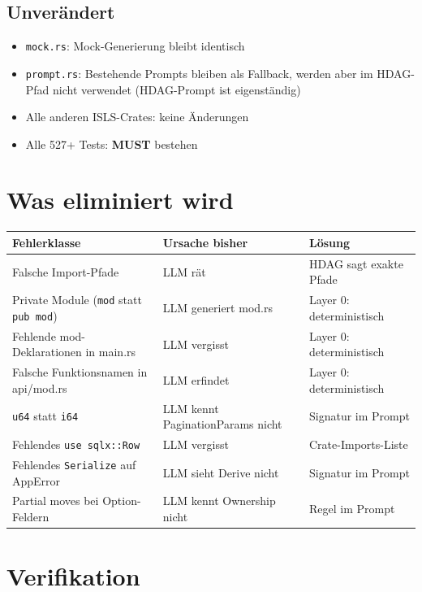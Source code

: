 \documentclass[11pt,a4paper]{article}
\newcommand{\must}{\textbf{MUST}}
\begin{document}
\subsection{Unverändert}

\begin{itemize}[nosep]
\item \texttt{mock.rs}: Mock-Generierung bleibt identisch
\item \texttt{prompt.rs}: Bestehende Prompts bleiben als Fallback,
  werden aber im HDAG-Pfad nicht verwendet (HDAG-Prompt ist eigenständig)
\item Alle anderen ISLS-Crates: keine Änderungen
\item Alle 527+ Tests: \must{} bestehen
\end{itemize}

\section{Was eliminiert wird}

\begin{center}
\begin{tabular}{lll}
\toprule
\textbf{Fehlerklasse} & \textbf{Ursache bisher} & \textbf{Lösung} \\
\midrule
Falsche Import-Pfade & LLM rät & HDAG sagt exakte Pfade \\
Private Module (\texttt{mod} statt \texttt{pub mod}) & LLM generiert mod.rs & Layer 0: deterministisch \\
Fehlende mod-Deklarationen in main.rs & LLM vergisst & Layer 0: deterministisch \\
Falsche Funktionsnamen in api/mod.rs & LLM erfindet & Layer 0: deterministisch \\
\texttt{u64} statt \texttt{i64} & LLM kennt PaginationParams nicht & Signatur im Prompt \\
Fehlendes \texttt{use sqlx::Row} & LLM vergisst & Crate-Imports-Liste \\
Fehlendes \texttt{Serialize} auf AppError & LLM sieht Derive nicht & Signatur im Prompt \\
Partial moves bei Option-Feldern & LLM kennt Ownership nicht & Regel im Prompt \\
\bottomrule
\end{tabular}
\end{center}

\section{Verifikation}
\end{document}
